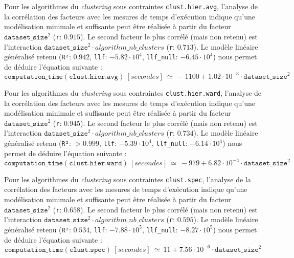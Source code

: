 			Pour les algorithmes du \textit{clustering} sous contraintes \texttt{clust.hier.avg}, l'analyse de la corrélation des facteurs avec les mesures de temps d'exécution indique qu'une modélisation minimale et suffisante peut être réalisée à partir du facteur $\texttt{dataset\_size}^{2}$ (\texttt{r}: $0.915$).
			Le second facteur le plus corrélé (mais non retenu) est l'interaction $\texttt{dataset\_size}^{2} \cdot algorithm\_nb\_clusters$ (\texttt{r}: $0.713$).
			Le modèle linéaire généralisé retenu (\texttt{R²}: $0.942$, \texttt{llf}: $-5.82 \cdot 10^{4}$, \texttt{llf\_null}: $-6.45 \cdot 10^{4}$) nous permet de déduire l'équation suivante :
			\begin{equation}
				\texttt{computation\_time}(\texttt{clust.hier.avg})~[secondes]~
				\simeq~-1100 + 1.02 \cdot 10^{-3} \cdot \texttt{dataset\_size}^{2}
			\end{equation}

			Pour les algorithmes du \textit{clustering} sous contraintes \texttt{clust.hier.ward}, l'analyse de la corrélation des facteurs avec les mesures de temps d'exécution indique qu'une modélisation minimale et suffisante peut être réalisée à partir du facteur $\texttt{dataset\_size}^{2}$ (\texttt{r}: $0.945$).
			Le second facteur le plus corrélé (mais non retenu) est l'interaction $\texttt{dataset\_size}^{2} \cdot algorithm\_nb\_clusters$ (\texttt{r}: $0.734$).
			Le modèle linéaire généralisé retenu (\texttt{R²}: $> 0.999$, \texttt{llf}: $-5.39 \cdot 10^{4}$, \texttt{llf\_null}: $-6.14 \cdot 10^{4}$) nous permet de déduire l'équation suivante :
			\begin{equation}
				\texttt{computation\_time}(\texttt{clust.hier.ward})~[secondes]~
				\simeq~-979 + 6.82 \cdot 10^{-4} \cdot \texttt{dataset\_size}^{2}
			\end{equation}
			
			Pour les algorithmes du \textit{clustering} sous contraintes \texttt{clust.spec}, l'analyse de la corrélation des facteurs avec les mesures de temps d'exécution indique qu'une modélisation minimale et suffisante peut être réalisée à partir du facteur $\texttt{dataset\_size}^{2}$ (\texttt{r}: $0.658$).
			Le second facteur le plus corrélé (mais non retenu) est l'interaction $\texttt{dataset\_size}^{2} \cdot algorithm\_nb\_clusters$ (\texttt{r}: $0.595$).
			Le modèle linéaire généralisé retenu (\texttt{R²}: $0.534$, \texttt{llf}: $-7.88 \cdot 10^{5}$, \texttt{llf\_null}: $-8.27 \cdot 10^{5}$) nous permet de déduire l'équation suivante :
			\begin{equation}
				\texttt{computation\_time}(\texttt{clust.spec})~[secondes]~
				\simeq~11 + 7.56 \cdot 10^{-6} \cdot \texttt{dataset\_size}^{2}
			\end{equation}
			
